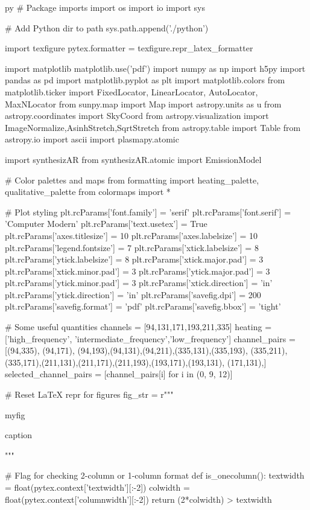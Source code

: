 \begin{pythontexcustomcode}{py}
# Package imports
import os
import io
import sys

# Add Python dir to path
sys.path.append('./python')

import texfigure
pytex.formatter = texfigure.repr_latex_formatter

import matplotlib
matplotlib.use('pdf')
import numpy as np
import h5py
import pandas as pd
import matplotlib.pyplot as plt
import matplotlib.colors
from matplotlib.ticker import FixedLocator, LinearLocator, AutoLocator, MaxNLocator
from sunpy.map import Map
import astropy.units as u
from astropy.coordinates import SkyCoord
from astropy.visualization import ImageNormalize,AsinhStretch,SqrtStretch
from astropy.table import Table
from astropy.io import ascii
import plasmapy.atomic

import synthesizAR
from synthesizAR.atomic import EmissionModel

# Color palettes and maps
from formatting import heating_palette, qualitative_palette
from colormaps import *

# Plot styling
plt.rcParams['font.family'] = 'serif'
plt.rcParams['font.serif'] = 'Computer Modern'
plt.rcParams['text.usetex'] = True
plt.rcParams['axes.titlesize'] = 10
plt.rcParams['axes.labelsize'] = 10
plt.rcParams['legend.fontsize'] = 7
plt.rcParams['xtick.labelsize'] = 8
plt.rcParams['ytick.labelsize'] = 8
plt.rcParams['xtick.major.pad'] = 3
plt.rcParams['xtick.minor.pad'] = 3
plt.rcParams['ytick.major.pad'] = 3
plt.rcParams['ytick.minor.pad'] = 3
plt.rcParams['xtick.direction'] = 'in'
plt.rcParams['ytick.direction'] = 'in'
plt.rcParams['savefig.dpi'] = 200
plt.rcParams['savefig.format'] = 'pdf'
plt.rcParams['savefig.bbox'] = 'tight'

# Some useful quantities
channels = [94,131,171,193,211,335]
heating = ['high_frequency', 'intermediate_frequency','low_frequency']
channel_pairs = [(94,335), (94,171), (94,193),(94,131),(94,211),(335,131),(335,193),
					(335,211),(335,171),(211,131),(211,171),(211,193),(193,171),(193,131),
					(171,131),]
selected_channel_pairs = [channel_pairs[i] for i in (0, 9, 12)]

# Reset LaTeX repr for figures
fig_str = r"""
\begin{{{figure_env_name}}}
	\centering
	{myfig}
	\caption{{{caption}}}
	\label{{{label}}}
\end{{{figure_env_name}}}
"""

# Flag for checking 2-column or 1-column format
def is_onecolumn():
	textwidth = float(pytex.context['textwidth'][:-2])
	colwidth = float(pytex.context['columnwidth'][:-2])
	return (2*colwidth) > textwidth
\end{pythontexcustomcode}
